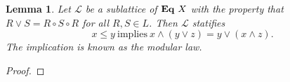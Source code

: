 \documentclass{article}
\newtheorem{lemma}[theorem]{Lemma}
\newcommand\lattice{\mathcal{L}}
\newcommand\eql[1]{\ensuremath\mathbf{Eq}~{#1}}
\begin{document}
\begin{lemma}
\rm Let $\lattice$ be a sublattice of $\eql{X}$ with the property that $R \vee S = R \circ S \circ R$ for all $R,S \in L$. Then $\lattice$ statifies 
$$
x \leq y~\text{implies}~x\wedge(y\vee z) = y\vee(x\wedge z).
$$
The implication is known as the modular law.
\end{lemma}

\begin{proof}

\end{proof}
\end{document}
